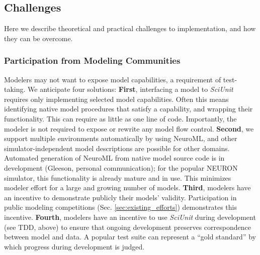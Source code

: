 \documentclass[11pt,letterpaper]{article}
\begin{document}
\subsection{Challenges}
Here we describe theoretical and practical challenges to implementation, and how they can be overcome.

\subsubsection{Participation from Modeling Communities}
Modelers may not want to expose model capabilities, a requirement of test-taking.  
We anticipate four solutions: \textbf{First}, interfacing a model to \textit{SciUnit} requires only implementing selected model capabilities. 
Often this means identifying native model procedures that satisfy a capability, and wrapping their functionality. 
This can require as little as one line of code. 
Importantly, the modeler is not required to expose or rewrite any model flow control. 
\textbf{Second}, we support multiple environments automatically by using NeuroML\cite{gleeson_neuroml:_2010}, and other simulator-independent model descriptions are possible for other domains. 
Automated generation of NeuroML from native model source code is in development (Gleeson, personal communication); for the popular NEURON simulator\cite{neuron_url}, this functionality is already mature and in use. 
This minimizes modeler effort for a large and growing number of models. 
\textbf{Third}, modelers have an incentive to demonstrate publicly their models' validity. 
Participation in public modeling competitions (Sec. \ref{sec:existing_efforts}) demonstrates this incentive. 
\textbf{Fourth}, modelers have an incentive to use \textit{SciUnit} during development (see TDD, above) to ensure that ongoing development preserves correspondence between model and data. 
A popular test suite can represent a ``gold standard'' by which progress during development is judged.
\end{document}

